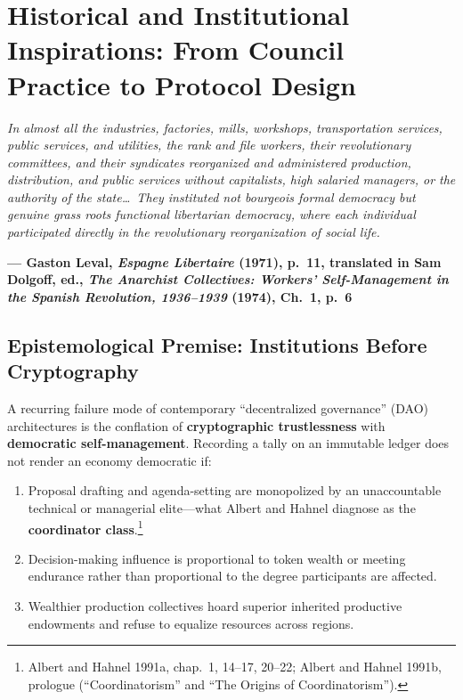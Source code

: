\documentclass[10pt,twoside,openany]{book}
\theoremstyle{dpepstyle}
\newcommand{\chapterepigraph}[2]{%
  \vspace{-0.4em}
  \begin{FlushRight}
  \begin{minipage}{0.82\textwidth}
    \itshape\small\color{SlateDark} #1\par
    \vspace{3pt}
    \upshape\footnotesize\textbf{--- #2}
  \end{minipage}
  \end{FlushRight}
  \vspace{1em}
}
\newenvironment{FlushRight}{\begin{flushright}}{\end{flushright}}
\begin{document}
\chapter{Historical and Institutional Inspirations: From Council Practice to Protocol Design}
\label{ch:history}

\chapterepigraph{In almost all the industries, factories, mills, workshops, transportation services, public services, and utilities, the rank and file workers, their revolutionary committees, and their syndicates reorganized and administered production, distribution, and public services without capitalists, high salaried managers, or the authority of the state\dots\ They instituted not bourgeois formal democracy but genuine grass roots functional libertarian democracy, where each individual participated directly in the revolutionary reorganization of social life.}{Gaston Leval, \emph{Espagne Libertaire} (1971), p.~11, translated in Sam Dolgoff, ed., \emph{The Anarchist Collectives: Workers' Self-Management in the Spanish Revolution, 1936--1939} (1974), Ch.~1, p.~6\protect\footnotemark}

\section{Epistemological Premise: Institutions Before Cryptography}
\label{sec:institutions-first}

A recurring failure mode of contemporary ``decentralized governance'' (DAO) architectures is the conflation of \textbf{cryptographic trustlessness} with \textbf{democratic self-management}. Recording a tally on an immutable ledger does not render an economy democratic if:
\begin{enumerate}[leftmargin=1.8em,itemsep=2pt]
  \item Proposal drafting and agenda-setting are monopolized by an unaccountable technical or managerial elite---what Albert and Hahnel diagnose as the \textbf{coordinator class}.\footnote{Albert and Hahnel 1991a, chap.~1, 14--17, 20--22; Albert and Hahnel 1991b, prologue (``Coordinatorism'' and ``The Origins of Coordinatorism'').}
  \item Decision-making influence is proportional to token wealth or meeting endurance rather than proportional to the degree participants are affected.
  \item Wealthier production collectives hoard superior inherited productive endowments and refuse to equalize resources across regions.
\end{enumerate}
\end{document}
